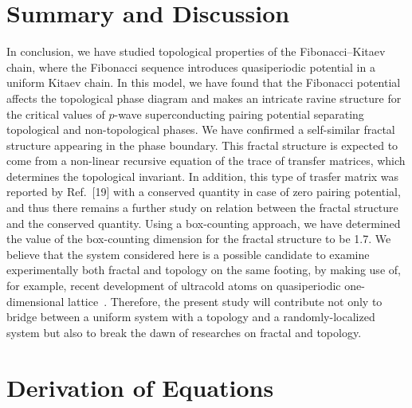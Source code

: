 \documentclass[%
superscriptaddress,
preprint,
amsmath,amssymb,
]{revtex4-1}
\begin{document}
\section{Summary and Discussion}
In conclusion, we have studied topological properties of the Fibonacci--Kitaev chain, where the Fibonacci sequence introduces quasiperiodic potential in a uniform Kitaev chain. 
In this model, we have found that the Fibonacci potential affects the topological phase diagram and makes an intricate ravine structure for the critical values of $p$-wave superconducting pairing potential separating topological and non-topological phases.
We have confirmed a self-similar fractal structure appearing in the phase boundary.
This fractal structure is expected to come from a non-linear recursive equation of the trace of transfer matrices, which determines the topological invariant.
In addition, this type of trasfer matrix was reported by Ref.~[19] with a conserved quantity in case of zero pairing potential, and thus there remains a further study on relation between the fractal structure and the conserved quantity.
Using a box-counting approach, we have determined the value of the box-counting dimension for the fractal structure to be 1.7.
We believe that the system considered here is a possible candidate to examine experimentally both fractal and topology on the same footing, by making use of, for example, recent development of ultracold atoms on quasiperiodic one-dimensional lattice~\cite{Modugno10}.
Therefore, the present study will contribute not only to bridge between a uniform system with a topology and a randomly-localized system but also to break the dawn of researches on fractal and topology.


\appendix
\section{Derivation of Equations}
\end{document}

